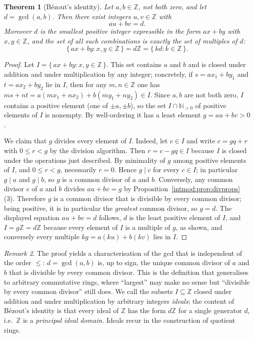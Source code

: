 \documentclass[11pt,a4paper]{article}
\newtheorem{theorem}{Theorem}[section]
\theoremstyle{definition}
\theoremstyle{remark}
\newtheorem{remark}[theorem]{Remark}
\newcommand{\N}{\ensuremath{\mathbb{N}}}
\newcommand{\Z}{\ensuremath{\mathbb{Z}}}
\begin{document}
\begin{theorem}[Bézout's identity]\label{intmod:thm:bezout}
Let \(a,b\in\Z\), not both zero, and let \(d=\gcd(a,b)\). Then there exist integers \(u,v\in\Z\) with
\[
au + bv = d.
\]
Moreover \(d\) is the \emph{smallest} positive integer expressible in the form \(ax+by\) with \(x,y\in\Z\), and the set of all such combinations is exactly the set of multiples of \(d\):
\[
\{\, ax+by : x,y\in\Z \,\} = d\Z = \{\, kd : k\in\Z \,\}.
\]
\end{theorem}

\begin{proof}
Let \(I=\{\,ax+by:x,y\in\Z\,\}\). This set contains \(a\) and \(b\) and is closed under addition and under multiplication by any integer; concretely, if \(s=ax_1+by_1\) and \(t=ax_2+by_2\) lie in \(I\), then for any \(m,n\in\Z\) one has \(ms+nt=a(mx_1+nx_2)+b(my_1+ny_2)\in I\). Since \(a,b\) are not both zero, \(I\) contains a positive element (one of \(\pm a,\pm b\)), so the set \(I\cap\N_{>0}\) of positive elements of \(I\) is nonempty. By well-ordering it has a least element \(g=au+bv>0\).

We claim that \(g\) divides every element of \(I\). Indeed, let \(c\in I\) and write \(c=gq+r\) with \(0\le r<g\) by the division algorithm. Then \(r=c-gq\in I\) because \(I\) is closed under the operations just described. By minimality of \(g\) among positive elements of \(I\), and \(0\le r<g\), necessarily \(r=0\). Hence \(g\mid c\) for every \(c\in I\); in particular \(g\mid a\) and \(g\mid b\), so \(g\) is a common divisor of \(a\) and \(b\). Conversely, any common divisor \(e\) of \(a\) and \(b\) divides \(au+bv=g\) by Proposition~\ref{intmod:prop:divprops}(3). Therefore \(g\) is a common divisor that is divisible by every common divisor; being positive, it is in particular the \emph{greatest} common divisor, so \(g=d\). The displayed equation \(au+bv=d\) follows, \(d\) is the least positive element of \(I\), and \(I=g\Z=d\Z\) because every element of \(I\) is a multiple of \(g\), as shown, and conversely every multiple \(kg=a(ku)+b(kv)\) lies in \(I\).
\end{proof}

\begin{remark}\label{intmod:rem:strongestgcd}
The proof yields a characterisation of the gcd that is independent of the order \(\le\): \(d=\gcd(a,b)\) is, up to sign, the unique common divisor of \(a\) and \(b\) that is divisible by every common divisor. This is the definition that generalises to arbitrary commutative rings, where ``largest'' may make no sense but ``divisible by every common divisor'' still does. We call the subsets \(I\subseteq\Z\) closed under addition and under multiplication by arbitrary integers \emph{ideals}; the content of Bézout's identity is that every ideal of \(\Z\) has the form \(d\Z\) for a single generator \(d\), i.e.\ \(\Z\) is a \emph{principal ideal domain}. Ideals recur in the construction of quotient rings.
\end{remark}
\end{document}
